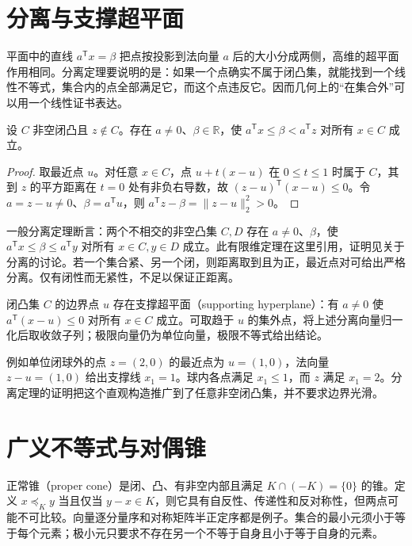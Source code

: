 \section{分离与支撑超平面}

平面中的直线 $a^{\mathsf T}x=\beta$ 把点按投影到法向量 $a$ 后的大小分成两侧，高维的超平面作用相同。分离定理要说明的是：如果一个点确实不属于闭凸集，就能找到一个线性不等式，集合内的点全部满足它，而这个点违反它。因而几何上的“在集合外”可以用一个线性证书表达。

\begin{theorem}[点与闭凸集的严格分离]
设 $C$ 非空闭凸且 $z\notin C$。存在 $a\ne0$、$\beta\in\mathbb R$，使 $a^{\mathsf T}x\leq\beta<a^{\mathsf T}z$ 对所有 $x\in C$ 成立。
\end{theorem}
\begin{proof}
取最近点 $u$。对任意 $x\in C$，点 $u+t(x-u)$ 在 $0\leq t\leq1$ 时属于 $C$，其到 $z$ 的平方距离在 $t=0$ 处有非负右导数，故 $(z-u)^{\mathsf T}(x-u)\leq0$。令 $a=z-u\ne0$、$\beta=a^{\mathsf T}u$，则 $a^{\mathsf T}z-\beta=\|z-u\|_2^2>0$。
\end{proof}

一般分离定理断言：两个不相交的非空凸集 $C,D$ 存在 $a\ne0$、$\beta$，使 $a^{\mathsf T}x\leq\beta\leq a^{\mathsf T}y$ 对所有 $x\in C,y\in D$ 成立。此有限维定理在这里引用，证明见\cite{boyd-vandenberghe}关于分离的讨论。若一个集合紧、另一个闭，则距离取到且为正，最近点对可给出严格分离。仅有闭性而无紧性，不足以保证正距离。

闭凸集 $C$ 的边界点 $u$ 存在支撑超平面（supporting hyperplane）：有 $a\ne0$ 使 $a^{\mathsf T}(x-u)\leq0$ 对所有 $x\in C$ 成立。可取趋于 $u$ 的集外点，将上述分离向量归一化后取收敛子列；极限向量仍为单位向量，极限不等式给出结论。

例如单位闭球外的点 $z=(2,0)$ 的最近点为 $u=(1,0)$，法向量 $z-u=(1,0)$ 给出支撑线 $x_1=1$。球内各点满足 $x_1\leq1$，而 $z$ 满足 $x_1=2$。分离定理的证明把这个直观构造推广到了任意非空闭凸集，并不要求边界光滑。

\section{广义不等式与对偶锥}

正常锥（proper cone）是闭、凸、有非空内部且满足 $K\cap(-K)=\{0\}$ 的锥。定义 $x\preceq_K y$ 当且仅当 $y-x\in K$，则它具有自反性、传递性和反对称性，但两点可能不可比较。向量逐分量序和对称矩阵半正定序都是例子。集合的最小元须小于等于每个元素；极小元只要求不存在另一个不等于自身且小于等于自身的元素。

